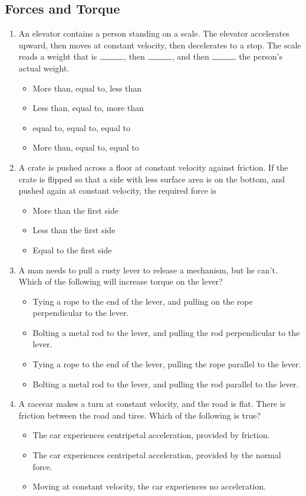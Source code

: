 \documentclass[10pt]{article}
\begin{document}
\subsection{Forces and Torque}
\begin{enumerate}
\item An elevator contains a person standing on a scale.  The elevator accelerates upward, then moves at constant velocity, then decelerates to a stop.  The scale reads a weight that is $\rule{1cm}{0.15mm}$, then $\rule{1cm}{0.15mm}$, and then $\rule{1cm}{0.15mm}$ the person's actual weight.
\begin{itemize}
\item More than, equal to, less than
\item Less than, equal to, more than
\item equal to, equal to, equal to
\item More than, equal to, equal to
\end{itemize}
\item A crate is pushed across a floor at constant velocity against friction.  If the crate is flipped so that a side with less surface area is on the bottom, and pushed again at constant velocity, the required force is
\begin{itemize}
\item More than the first side
\item Less than the first side
\item Equal to the first side
\end{itemize}
\item A man needs to pull a rusty lever to release a mechanism, but he can't.  Which of the following will increase torque on the lever?
\begin{itemize}
\item Tying a rope to the end of the lever, and pulling on the rope perpendicular to the lever.
\item Bolting a metal rod to the lever, and pulling the rod perpendicular to the lever.
\item Tying a rope to the end of the lever, pulling the rope parallel to the lever.
\item Bolting a metal rod to the lever, and pulling the rod parallel to the lever.
\end{itemize}
\item A racecar makes a turn at constant velocity, and the road is flat.  There is friction between the road and tires.  Which of the following is true?
\begin{itemize}
\item The car experiences centripetal acceleration, provided by friction.
\item The car experiences centripetal acceleration, provided by the normal force.
\item Moving at constant velocity, the car experiences no acceleration.
\end{itemize}
\end{enumerate}
\end{document}

